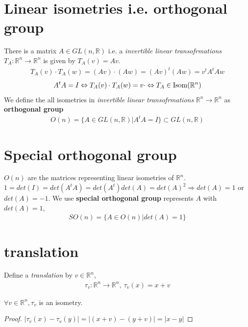 \documentclass[11pt]{elegantbook}
\begin{document}
\section{ Linear isometries i.e. orthogonal group}
There is a matrix $A\in GL(n,\mathbb{R})$ i.e. a \textit{invertible linear transofrmations} $T_A: \mathbb{R}^n \rightarrow \mathbb{R}^n$ is given by $T_A(v)=Av$.
\begin{equation}
    \begin{aligned}
        T_A(v)\cdot T_A(w)=(Av)\cdot(Aw)=(Av)^t(Aw)=v^tA^tAw
    \end{aligned}
    \nonumber
\end{equation}
\begin{equation}
    \begin{aligned}
        A^tA=I\Leftrightarrow T_A(v)\cdot T_A(w)=v\cdot \Leftrightarrow T_A\in \textnormal{Isom}(\mathbb{R}^n)
    \end{aligned}
    \nonumber
\end{equation}
We define the all isometries in \textit{invertible linear transofrmations} $\mathbb{R}^n \rightarrow \mathbb{R}^n$ as \textbf{orthogonal group}
\begin{equation}
    \begin{aligned}
        O(n)=\{A\in GL(n,\mathbb{R})|A^tA=I \}\subset GL(n,\mathbb{R})
    \end{aligned}
    \nonumber
\end{equation}

\section{Special orthogonal group}
$O(n)$ are the matrices representing linear isometries of $\mathbb{R}^n$.
$1=det(I)=det(A^tA)=det(A^t)det(A)=det(A)^2 \Rightarrow	det(A)=1$ or $det(A)=-1$. We use \textbf{special orthogonal group} represents $A$ with $det(A)=1$,
\begin{equation}
    \begin{aligned}
        SO(n)=\{A\in O(n) | det(A)=1\}
    \end{aligned}
    \nonumber
\end{equation}

\section{translation}
Define a \textit{translation} by $v\in \mathbb{R}^n$,
\begin{equation}
    \begin{aligned}
        \tau_v:\mathbb{R}^n \rightarrow \mathbb{R}^n,\ \tau_v(x)=x+v
    \end{aligned}
    \nonumber
\end{equation}
\begin{note}[Exercise 2.5.3]
$\forall v\in \mathbb{R}^n, \tau_v$ is an isometry.
\end{note}
\begin{proof}
$|\tau_v(x)-\tau_v(y)|=|(x+v)-(y+v)|=|x-y|$
\end{proof}
\end{document}
